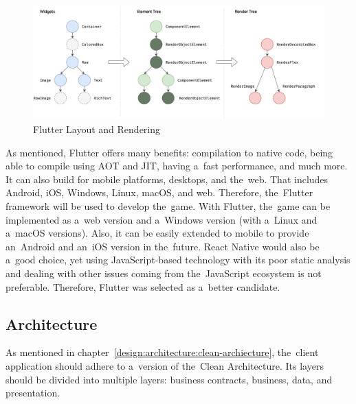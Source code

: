 \begin{figure}
    \centering
    \includegraphics[width=1\linewidth]{assets/design/fluttertrees.png}
    \caption{Flutter Layout and Rendering~\cite{a2022_flutter_architecture}}
    \label{fig:design:fluttertrees}
\end{figure}

As mentioned, Flutter offers many benefits: compilation to native code, being able to compile using AOT and JIT, having a~fast performance, and much more.
It can also build for mobile platforms, desktops, and the~web.
That includes Android, iOS, Windows, Linux, macOS, and web.
Therefore, the~Flutter framework will be used to develop the~game.
With Flutter, the~game can be implemented as a~web version and a~Windows version (with a~Linux and a~macOS versions).
Also, it can be easily extended to mobile to provide an~Android and an~iOS version in the~future.
React Native would also be a~good choice, yet using JavaScript-based technology with its poor static analysis and dealing with other issues coming from the~JavaScript ecosystem is not preferable.
Therefore, Flutter was selected as a~better candidate.

\subsection{Architecture}

As mentioned in chapter~\ref{design:architecture:clean-archiecture}, the~client application should adhere to a~version of the~Clean Architecture.
Its layers should be divided into multiple layers: business contracts, business, data, and presentation.

